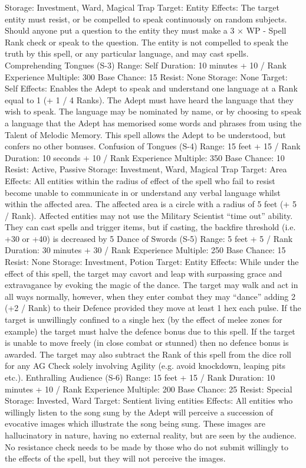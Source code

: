 \documentclass[a4paper]{article}
\begin{document}
\begin{multicols}{3}
Storage: Investment, Ward, Magical Trap
Target: Entity
Effects: The target entity must resist, or be compelled to speak continuously on random subjects.
Should anyone put a question to the entity they
must make a 3 × WP - Spell Rank check or speak
to the question. The entity is not compelled to
speak the truth by this spell, or any particular language, and may cast spells.
Comprehending Tongues (S-3)
Range: Self
Duration: 10 minutes + 10 / Rank
Experience Multiple: 300
Base Chance: 15%
Resist: None
Storage: None
Target: Self
Effects: Enables the Adept to speak and understand
one language at a Rank equal to 1 (+ 1 / 4 Ranks).
The Adept must have heard the language that they
wish to speak. The language may be nominated by
name, or by choosing to speak a language that the
Adept has memorised some words and phrases
from using the Talent of Melodic Memory. This
spell allows the Adept to be understood, but confers no other bonuses.
Confusion of Tongues (S-4)
Range: 15 feet + 15 / Rank
Duration: 10 seconds + 10 / Rank
Experience Multiple: 350
Base Chance: 10%
Resist: Active, Passive
Storage: Investment, Ward, Magical Trap
Target: Area
Effects: All entities within the radius of effect of
the spell who fail to resist become unable to communicate in or understand any verbal language
whilst within the affected area. The affected area is
a circle with a radius of 5 feet (+ 5 / Rank). Affected entities may not use the Military Scientist
“time out” ability. They can cast spells and trigger
items, but if casting, the backfire threshold (i.e.
+30 or +40) is decreased by 5%
Dance of Swords (S-5)
Range: 5 feet + 5 / Rank
Duration: 30 minutes + 30 / Rank
Experience Multiple: 250
Base Chance: 15%
Resist: None
Storage: Investment, Potion
Target: Entity
Effects: While under the effect of this spell, the
target may cavort and leap with surpassing grace
and extravagance by evoking the magic of the
dance. The target may walk and act in all ways
normally, however, when they enter combat they
may “dance” adding 2 (+2 / Rank) to their Defence
provided they move at least 1 hex each pulse. If the
target is unwillingly confined to a single hex (by
the effect of melee zones for example) the target
must halve the defence bonus due to this spell. If
the target is unable to move freely (in close combat
or stunned) then no defence bonus is awarded. The
target may also subtract the Rank of this spell from
the dice roll for any AG Check solely involving
Agility (e.g. avoid knockdown, leaping pits etc.).
Enthralling Audience (S-6)
Range: 15 feet + 15 / Rank
Duration: 10 minutes + 10 / Rank
Experience Multiple: 200
Base Chance: 25%
Resist: Special
Storage: Invested, Ward
Target: Sentient living entities
Effects: All entities who willingly listen to the song
sung by the Adept will perceive a succession of
evocative images which illustrate the song being
sung. These images are hallucinatory in nature,
having no external reality, but are seen by the
audience. No resistance check needs to be made by
those who do not submit willingly to the effects of
the spell, but they will not perceive the images.


\end{multicols}
\end{document}
